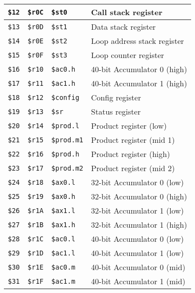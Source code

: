 \documentclass[oneside,english,a4paper,10pt,oneside,openany,final]{memoir}
\newcommand{\Register}[1]{\texttt{#1}}
\begin{document}
\begin{table}[htb]
\begin{tabular}{|l|l|l|l|}
\Register{\$12} & \Register{\$r0C} & \Register{\$st0}     & Call stack register         \\ \hline
\Register{\$13} & \Register{\$r0D} & \Register{\$st1}     & Data stack register         \\ \hline
\Register{\$14} & \Register{\$r0E} & \Register{\$st2}     & Loop address stack register \\ \hline
\Register{\$15} & \Register{\$r0F} & \Register{\$st3}     & Loop counter register       \\ \hline
\Register{\$16} & \Register{\$r10} & \Register{\$ac0.h}   & 40-bit Accumulator 0 (high) \\ \hline
\Register{\$17} & \Register{\$r11} & \Register{\$ac1.h}   & 40-bit Accumulator 1 (high) \\ \hline
\Register{\$18} & \Register{\$r12} & \Register{\$config}  & Config register             \\ \hline
\Register{\$19} & \Register{\$r13} & \Register{\$sr}      & Status register             \\ \hline
\Register{\$20} & \Register{\$r14} & \Register{\$prod.l}  & Product register (low)      \\ \hline
\Register{\$21} & \Register{\$r15} & \Register{\$prod.m1} & Product register (mid 1)    \\ \hline
\Register{\$22} & \Register{\$r16} & \Register{\$prod.h}  & Product register (high)     \\ \hline
\Register{\$23} & \Register{\$r17} & \Register{\$prod.m2} & Product register (mid 2)    \\ \hline
\Register{\$24} & \Register{\$r18} & \Register{\$ax0.l}   & 32-bit Accumulator 0 (low)  \\ \hline
\Register{\$25} & \Register{\$r19} & \Register{\$ax0.h}   & 32-bit Accumulator 0 (high) \\ \hline
\Register{\$26} & \Register{\$r1A} & \Register{\$ax1.l}   & 32-bit Accumulator 1 (low)  \\ \hline
\Register{\$27} & \Register{\$r1B} & \Register{\$ax1.h}   & 32-bit Accumulator 1 (high) \\ \hline
\Register{\$28} & \Register{\$r1C} & \Register{\$ac0.l}   & 40-bit Accumulator 0 (low)  \\ \hline
\Register{\$29} & \Register{\$r1D} & \Register{\$ac1.l}   & 40-bit Accumulator 1 (low)  \\ \hline
\Register{\$30} & \Register{\$r1E} & \Register{\$ac0.m}   & 40-bit Accumulator 0 (mid)  \\ \hline
\Register{\$31} & \Register{\$r1F} & \Register{\$ac1.m}   & 40-bit Accumulator 1 (mid)  \\ \hline
\end{tabular}
\end{table}
\end{document}
